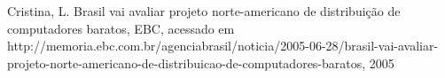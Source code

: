 \documentclass[
12pt,		%
openright,	%
twoside,  %
a4paper,			%
chapter=TITLE,		%
english,			%
french,				%
spanish,			%
brazil				%
]{USPSC-classe/USPSC}
\begin{document}
\begin{flushleft}
\begin{flushleft}
\begin{flushleft}
\begin{flushleft}
\begin{flushleft}
\begin{flushleft}
\begin{flushleft}
\begin{flushleft}
\begin{flushleft}
\begin{flushleft}
[CRISTINA, 2005] Cristina, L. Brasil vai avaliar projeto norte-americano de distribui\c{c}\~ao de computadores baratos, EBC, acessado em http://memoria.ebc.com.br/agenciabrasil/noticia/2005-06-28/brasil-vai-avaliar-projeto-norte-americano-de-distribuicao-de-computadores-baratos, 2005
\end{flushleft}


\end{flushleft}


\end{flushleft}


\end{flushleft}


\end{flushleft}


\end{flushleft}


\end{flushleft}


\end{flushleft}


\end{flushleft}


\end{flushleft}
\end{document}
